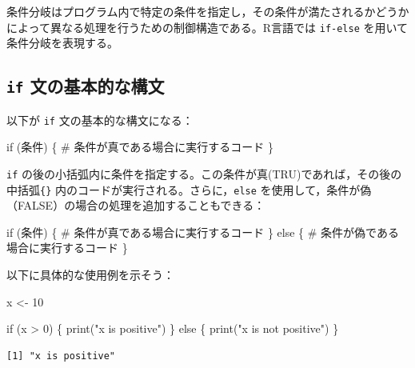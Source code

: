 \documentclass[
  a4paper,
]{ltjsbook}
\newenvironment{Shaded}{\begin{snugshade}}{\end{snugshade}}
\newcommand{\CommentTok}[1]{\textcolor[rgb]{0.37,0.37,0.37}{#1}}
\newcommand{\ControlFlowTok}[1]{\textcolor[rgb]{0.00,0.23,0.31}{#1}}
\newcommand{\DecValTok}[1]{\textcolor[rgb]{0.68,0.00,0.00}{#1}}
\newcommand{\FunctionTok}[1]{\textcolor[rgb]{0.28,0.35,0.67}{#1}}
\newcommand{\NormalTok}[1]{\textcolor[rgb]{0.00,0.23,0.31}{#1}}
\newcommand{\OtherTok}[1]{\textcolor[rgb]{0.00,0.23,0.31}{#1}}
\newcommand{\SpecialCharTok}[1]{\textcolor[rgb]{0.37,0.37,0.37}{#1}}
\newcommand{\StringTok}[1]{\textcolor[rgb]{0.13,0.47,0.30}{#1}}
\begin{document}
条件分岐はプログラム内で特定の条件を指定し，その条件が満たされるかどうかによって異なる処理を行うための制御構造である。R言語では
\texttt{if-else} を用いて条件分岐を表現する。

\subsection{\texorpdfstring{\texttt{if}
文の基本的な構文}{if 文の基本的な構文}}\label{if-ux6587ux306eux57faux672cux7684ux306aux69cbux6587}

以下が \texttt{if} 文の基本的な構文になる：

\begin{Shaded}
\begin{Highlighting}[]
\ControlFlowTok{if}\NormalTok{ (条件) \{}
    \CommentTok{\# 条件が真である場合に実行するコード}
\NormalTok{\}}
\end{Highlighting}
\end{Shaded}

\texttt{if}
の後の小括弧内に条件を指定する。この条件が真(TRU)であれば，その後の
中括弧\texttt{\{\}} 内のコードが実行される。さらに，\texttt{else}
を使用して，条件が偽（FALSE）の場合の処理を追加することもできる：

\begin{Shaded}
\begin{Highlighting}[]
\ControlFlowTok{if}\NormalTok{ (条件) \{}
    \CommentTok{\# 条件が真である場合に実行するコード}
\NormalTok{\} }\ControlFlowTok{else}\NormalTok{ \{}
    \CommentTok{\# 条件が偽である場合に実行するコード}
\NormalTok{\}}
\end{Highlighting}
\end{Shaded}

以下に具体的な使用例を示そう：

\begin{Shaded}
\begin{Highlighting}[]
\NormalTok{x }\OtherTok{\textless{}{-}} \DecValTok{10}

\ControlFlowTok{if}\NormalTok{ (x }\SpecialCharTok{\textgreater{}} \DecValTok{0}\NormalTok{) \{}
  \FunctionTok{print}\NormalTok{(}\StringTok{"x is positive"}\NormalTok{)}
\NormalTok{\} }\ControlFlowTok{else}\NormalTok{ \{}
  \FunctionTok{print}\NormalTok{(}\StringTok{"x is not positive"}\NormalTok{)}
\NormalTok{\}}
\end{Highlighting}
\end{Shaded}

\begin{verbatim}
[1] "x is positive"
\end{verbatim}
\end{document}
